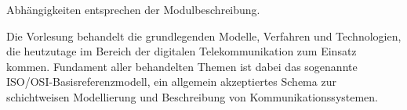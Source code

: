 \begin{course}

\setdoclanguagegerman
{}



\coursehead


\label{cour_5053.dp_997}


\begin{styleenv}
\begin{assessment}

\end{assessment}

\begin{conditions}Abhängigkeiten entsprechen der Modulbeschreibung.

\end{conditions}


\end{styleenv}

\begin{learningoutcomes}
Die Vorlesung behandelt die grundlegenden Modelle, Verfahren und Technologien, die heutzutage im Bereich der digitalen Telekommunikation zum Einsatz kommen. Fundament aller behandelten Themen ist dabei das sogenannte ISO/OSI-Basisreferenzmodell, ein allgemein akzeptiertes Schema zur schichtweisen Modellierung und Beschreibung von Kommunikationssystemen.


\end{learningoutcomes}


\end{course}
